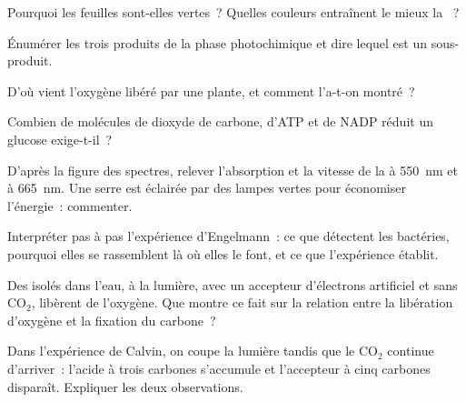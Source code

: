 \begin{exercise}[$\star$]\label{exo:g12:photosynthesis:2}
Pourquoi les feuilles sont-elles vertes~? Quelles couleurs entraînent
le mieux la ~?
\end{exercise}

\begin{exercise}[$\star$]\label{exo:g12:photosynthesis:3}
Énumérer les trois produits de la phase photochimique et dire lequel
est un sous-produit.
\end{exercise}

\begin{exercise}[$\star$]\label{exo:g12:photosynthesis:4}
D'où vient l'oxygène libéré par une plante, et comment l'a-t-on
montré~?
\end{exercise}

\begin{exercise}[$\star$]\label{exo:g12:photosynthesis:5}
Combien de molécules de dioxyde de carbone, d'ATP et de NADP réduit un
glucose exige-t-il~?
\end{exercise}

\begin{exercise}[$\star\star$]\label{exo:g12:photosynthesis:6}
D'après la figure des spectres, relever l'absorption et la vitesse de
la  à \qty{550}{nm} et à \qty{665}{nm}. Une serre est
éclairée par des lampes vertes pour économiser l'énergie~: commenter.
\end{exercise}

\begin{exercise}[$\star\star$]\label{exo:g12:photosynthesis:7}
Interpréter pas à pas l'expérience d'Engelmann~: ce que détectent les
bactéries, pourquoi elles se rassemblent là où elles le font, et ce
que l'expérience établit.
\end{exercise}

\begin{exercise}[$\star\star$]\label{exo:g12:photosynthesis:8}
Des  isolés dans l'eau, à la lumière, avec un accepteur
d'électrons artificiel et sans $\mathrm{CO_2}$, libèrent de l'oxygène.
Que montre ce fait sur la relation entre la libération d'oxygène et la
fixation du carbone~?
\end{exercise}

\begin{exercise}[$\star\star$]\label{exo:g12:photosynthesis:9}
Dans l'expérience de Calvin, on coupe la lumière tandis que le
$\mathrm{CO_2}$ continue d'arriver~: l'acide à trois carbones
s'accumule et l'accepteur à cinq carbones disparaît. Expliquer les
deux observations.
\end{exercise}


